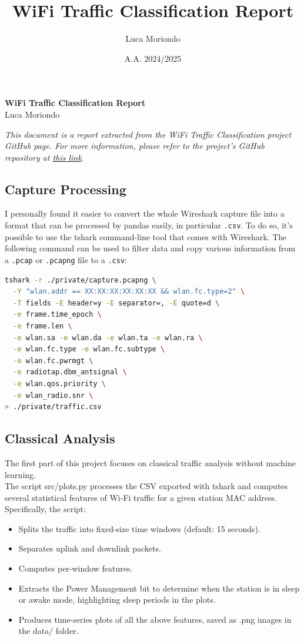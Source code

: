 \documentclass[a4paper,10pt]{article}
\title{\textbf{WiFi Traffic Classification Report}}
\author{Luca Moriondo}
\date{A.A. 2024/2025}
\begin{document}
\begin{center}
    \Large\textbf{WiFi Traffic Classification Report}\\
    \large{Luca Moriondo}\\
\end{center}

\textit{This document is a report extracted from the WiFi Traffic Classification project GitHub page. For more information, please refer to the project's GitHub repository at \href{https://github.com/MorioSnek/wifi-traffic-classification}{this link}}.

\subsection*{Capture Processing}
I personally found it easier to convert the whole Wireshark capture file into a format that can be processed by pandas easily, in particular \texttt{.csv}. To do so, it's possible to use the tshark command-line tool that comes with Wireshark. The following command can be used to filter data and copy various information from a \texttt{.pcap} or \texttt{.pcapng} file to a \texttt{.csv}:

\begin{lstlisting}[language=bash]
tshark -r ./private/capture.pcapng \
  -Y "wlan.addr == XX:XX:XX:XX:XX:XX && wlan.fc.type=2" \
  -T fields -E header=y -E separator=, -E quote=d \
  -e frame.time_epoch \
  -e frame.len \
  -e wlan.sa -e wlan.da -e wlan.ta -e wlan.ra \
  -e wlan.fc.type -e wlan.fc.subtype \
  -e wlan.fc.pwrmgt \
  -e radiotap.dbm_antsignal \
  -e wlan.qos.priority \
  -e wlan_radio.snr \
> ./private/traffic.csv
\end{lstlisting}

\subsection*{Classical Analysis}
The first part of this project focuses on classical traffic analysis without machine learning.\\
The script src/plots.py processes the CSV exported with tshark and computes several statistical features of Wi-Fi traffic for a given station MAC address.\\

Specifically, the script:
\begin{itemize}
    \item Splits the traffic into fixed-size time windows (default: 15 seconds).
    \item Separates uplink and downlink packets.
    \item Computes per-window features.
    \item Extracts the Power Management bit to determine when the station is in sleep or awake mode, highlighting sleep periods in the plots.
    \item Produces time-series plots of all the above features, saved as .png images in the data/ folder.
\end{itemize}
\end{document}

